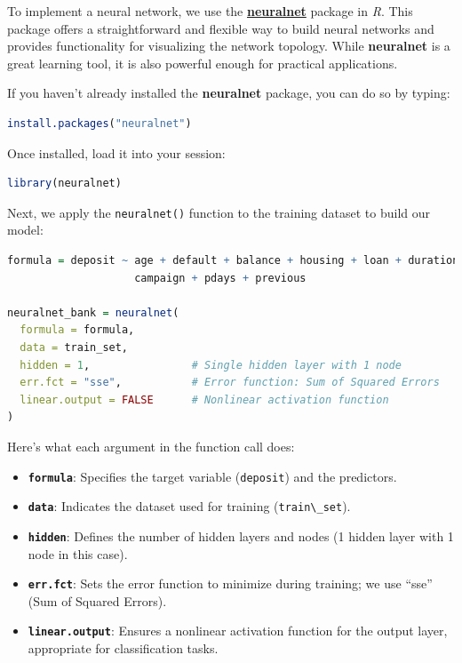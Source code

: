 \documentclass[
]{book}
\newcommand{\passthrough}[1]{#1}
\providecommand{\tightlist}{%
  \setlength{\itemsep}{0pt}\setlength{\parskip}{0pt}}
\theoremstyle{definition}
\theoremstyle{definition}
\theoremstyle{definition}
\theoremstyle{definition}
\theoremstyle{remark}
\begin{document}
To implement a neural network, we use the \href{https://CRAN.R-project.org/package=neuralnet}{\textbf{neuralnet}} package in \emph{R}. This package offers a straightforward and flexible way to build neural networks and provides functionality for visualizing the network topology. While \textbf{neuralnet} is a great learning tool, it is also powerful enough for practical applications.

If you haven't already installed the \textbf{neuralnet} package, you can do so by typing:

\begin{lstlisting}[language=R]
install.packages("neuralnet")
\end{lstlisting}

Once installed, load it into your session:

\begin{lstlisting}[language=R]
library(neuralnet)
\end{lstlisting}

Next, we apply the \passthrough{\lstinline!neuralnet()!} function to the training dataset to build our model:

\begin{lstlisting}[language=R]
formula = deposit ~ age + default + balance + housing + loan + duration + 
                    campaign + pdays + previous

neuralnet_bank = neuralnet(
  formula = formula,
  data = train_set,
  hidden = 1,                # Single hidden layer with 1 node
  err.fct = "sse",           # Error function: Sum of Squared Errors
  linear.output = FALSE      # Nonlinear activation function
)
\end{lstlisting}

Here's what each argument in the function call does:

\begin{itemize}
\tightlist
\item
  \textbf{\passthrough{\lstinline!formula!}}: Specifies the target variable (\passthrough{\lstinline!deposit!}) and the predictors.\\
\item
  \textbf{\passthrough{\lstinline!data!}}: Indicates the dataset used for training (\passthrough{\lstinline!train\_set!}).\\
\item
  \textbf{\passthrough{\lstinline!hidden!}}: Defines the number of hidden layers and nodes (1 hidden layer with 1 node in this case).\\
\item
  \textbf{\passthrough{\lstinline!err.fct!}}: Sets the error function to minimize during training; we use ``sse'' (Sum of Squared Errors).\\
\item
  \textbf{\passthrough{\lstinline!linear.output!}}: Ensures a nonlinear activation function for the output layer, appropriate for classification tasks.
\end{itemize}
\end{document}
